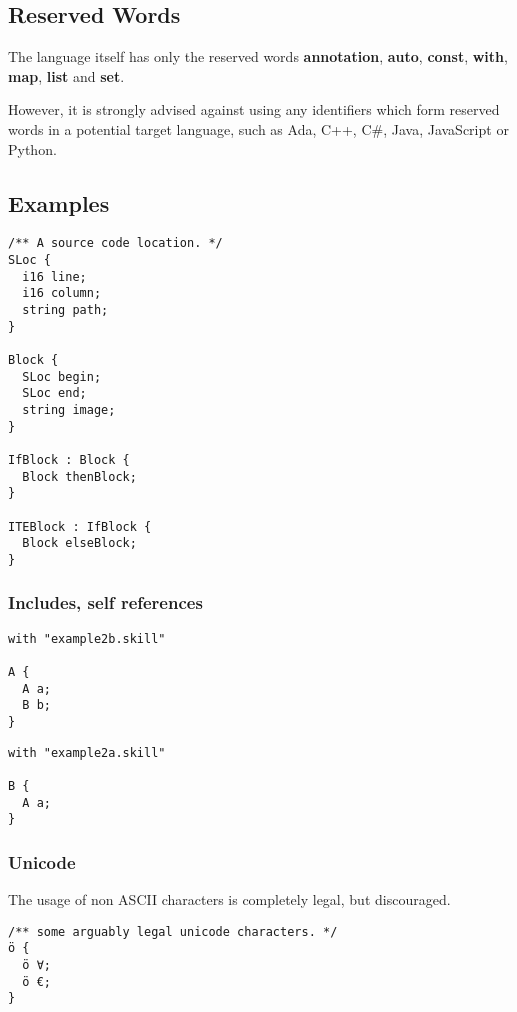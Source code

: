 \documentclass[a4paper,10pt]{article}
\begin{document}
\subsection{Reserved Words}

The language itself has only the reserved words \textbf{annotation}, \textbf{auto}, \textbf{const}, \textbf{with}, \textbf{map}, \textbf{list} and \textbf{set}. 

However, it is strongly advised against using any identifiers which form reserved words in a potential target language, such as Ada, C++, C\#, Java, JavaScript or Python.

\subsection{Examples}

\begin{lstlisting}[label=blockExample,caption=Running Example,language=skill]
/** A source code location. */
SLoc {
  i16 line;
  i16 column;
  string path;
}

Block {
  SLoc begin;
  SLoc end;
  string image;
}

IfBlock : Block {
  Block thenBlock;
}

ITEBlock : IfBlock {
  Block elseBlock;
}
\end{lstlisting}

\subsubsection*{Includes, self references}

\begin{lstlisting}[label=example2a,caption=Example 2a,language=skill]
with "example2b.skill"

A {
  A a;
  B b;
}
\end{lstlisting}

\begin{lstlisting}[label=example2b,caption=Example 2b,language=skill]
with "example2a.skill"

B {
  A a;
}
\end{lstlisting}

\subsubsection*{Unicode}
The usage of non ASCII characters is completely legal, but discouraged.
\begin{lstlisting}[label=unicode,caption=Unicode Support,language=skill]
/** some arguably legal unicode characters. */
ö {
  ö ∀;
  ö €;
}
\end{lstlisting}
\end{document}
